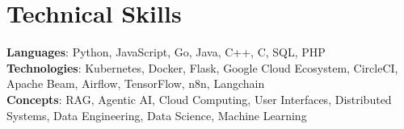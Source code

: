 \vspace{-8pt}
\section{Technical Skills}
    \begin{itemize}[leftmargin=0.15in, label={}]
	\small{\item{
		\textbf{Languages}{: Python, JavaScript, Go, Java, C++, C, SQL, PHP} \\
		\textbf{Technologies}{: Kubernetes, Docker, Flask, Google Cloud Ecosystem, CircleCI, Apache Beam, Airflow, TensorFlow, n8n, Langchain} \\
		\textbf{Concepts}{: RAG, Agentic AI, Cloud Computing, User Interfaces, Distributed Systems, Data Engineering, Data Science, Machine Learning }
	}}
    \end{itemize}